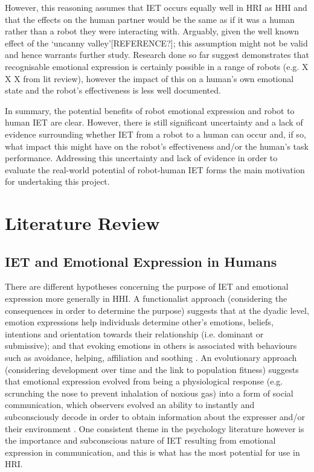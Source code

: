 \documentclass[11pt]{article}
\begin{document}
However, this reasoning assumes that IET occurs equally well in HRI as HHI and that the effects on the human partner would be the same as if it was a human rather than a robot they were interacting with. Arguably, given the well known effect of the `uncanny valley'[REFERENCE?]; this assumption might not be valid and hence warrants further study. Research done so far suggest demonstrates that recognisable emotional expression is certainly possible in a range of robots (e.g. X X X from lit review), however the impact of this on a human's own emotional state and the robot's effectiveness is less well documented. 

In summary, the potential benefits of robot emotional expression and robot to human IET are clear. However, there is still significant uncertainty and a lack of evidence surrounding whether IET from a robot to a human can occur  and, if so, what impact this might have on the robot's effectiveness and/or the human's task performance. Addressing this uncertainty and lack of evidence in order to evaluate the real-world potential of robot-human IET forms the main motivation for undertaking this project. 

\section{Literature Review}
\subsection{IET and Emotional Expression in Humans}
There are different hypotheses concerning the purpose of IET and emotional expression more generally in HHI. A functionalist approach (considering the consequences in order to determine the purpose) suggests that at the dyadic level, emotion expressions help individuals determine other's emotions, beliefs, intentions and orientation towards their relationship (i.e. dominant or submissive); and that evoking emotions in others is associated with behaviours such as avoidance, helping, affiliation and soothing \cite{keltner1999social}. An evolutionary approach (considering development over time and the link to population fitness) suggests that emotional expression evolved from being a physiological response (e.g. scrunching the nose to prevent inhalation of noxious gas) into a form of social communication, which observers evolved an ability to instantly and subconsciously decode in order to obtain information about the expresser and/or their environment \cite{shariff2011emotion}. One consistent theme in the psychology literature however is the importance and subconscious nature of IET resulting from emotional expression in communication, and this is what has the most potential for use in HRI. 
\end{document}
